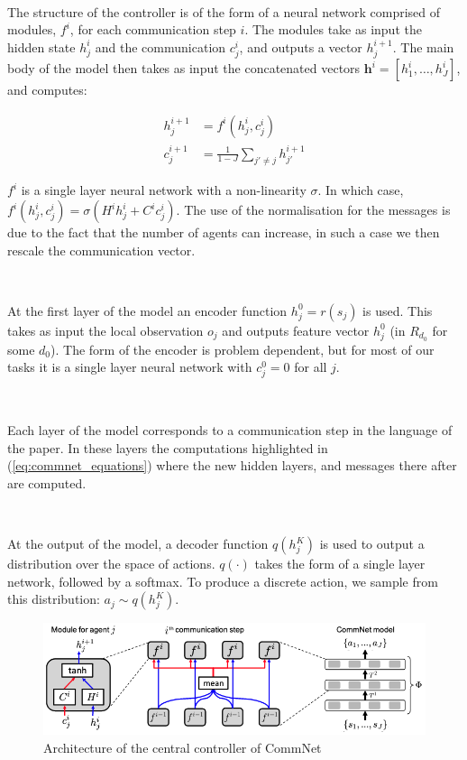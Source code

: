 \documentclass{article}
\begin{document}
\

The structure of the controller is of the form of a neural network comprised of modules, $f^i$, for each communication step $i$. The modules take as input the hidden state $h^i_j$ and the communication $c^i_j$,  and outputs a vector $h^{i+1}_j$. The main body of the model then takes as input the concatenated vectors $\mathbf{h}^i = [h^i_1, \hdots,  h^i_J]$, and computes:


\begin{equation}\label{eq:commnet_equations}
\begin{aligned}
	h_j^{i+1} &= f^i(h^i_j, c^i_j) \\
	c_j^{i+1} &= \frac{1}{1 - J} \sum_{j' \neq j} h_{j'}^{i + 1}
\end{aligned}
\end{equation}

$f^i$ is a single layer neural network with a non-linearity $\sigma$. In which case, $f^i(h^i_j, c^i_j) = \sigma(H^i h^i_j +  C^i c^i_j)$. The use of the normalisation for the messages is due to the fact that the number of agents can increase, in such a case we then rescale the communication vector.

\

At the first layer of the model an encoder function $h_j^0 = r(s_j)$ is used. This takes as input the local observation $o_j$ and outputs feature vector $h_j^0$ (in $R_{d_0}$ for some $d_0$). The form of the encoder is problem dependent,  but for most of our tasks it is a single layer neural network with $c_j^0 = 0$ for all $j$.  

\

Each layer of the model corresponds to a communication step in the language of the paper. In these layers the computations highlighted in (\ref{eq:commnet_equations}) where the new hidden layers, and messages there after are computed.

\

At the output of the model, a decoder function $q(h_j^K)$ is used to output a distribution over the space of  actions. $q(\cdot)$ takes the form of a single layer network, followed by a softmax. To produce a discrete  action, we sample from this distribution: $a_j \sim q(h_j^K )$.  

\begin{figure}
	\centering
	\includegraphics[scale=0.5]{images/commnet.png}
	\caption{Architecture of the central controller of CommNet \citep{sukhbaatar2016commnet}}
	\label{fig:commnet}
\end{figure}
\end{document}
